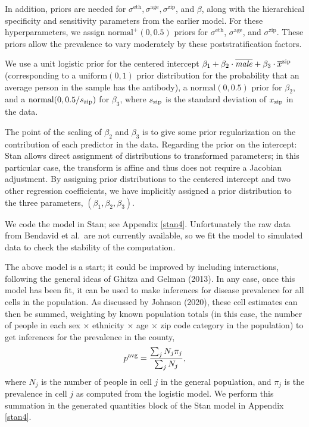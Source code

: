 \documentclass[11pt]{article}
\begin{document}
In addition, priors are needed for
$\sigma^{\textrm{eth}}, \sigma^{\textrm{age}}, \sigma^{\textrm{zip}}$,
and $\beta$, along with the hierarchical specificity and sensitivity
parameters from the earlier model.  
For these hyperparameters, we assign $\mbox{normal}^+(0, 0.5)$ priors for
$\sigma^{\textrm{eth}}$, $\sigma^{\textrm{age}}$, and
$\sigma^{\textrm{zip}}$.  These priors allow the prevalence to vary
moderately by these poststratification factors.

We use a unit logistic prior for the centered
intercept
$\beta_1 + \beta_2 \cdot \overline{\it male} + \beta_3 \cdot \overline{x}^{\rm zip}$
(corresponding to a $\mbox{uniform}(0,1)$ prior distribution for the probability that an average person in the
sample has the antibody), a $\mbox{normal}(0,0.5)$ prior for
$\beta_2$, and a $\mbox{normal}(0, 0.5/s_{\rm zip})$ for $\beta_3$, where $s_{\rm zip}$ is the standard deviation of $x_{\rm zip}$ in the data.

The point of the scaling of $\beta_2$ and $\beta_3$ is to give some prior regularization on the contribution of each predictor in the data.  Regarding the prior on the intercept:
Stan allows direct assignment of distributions to
  transformed parameters; in this particular case, the transform is
  affine and thus does not require a Jacobian adjustment.  By assigning prior distributions to the centered intercept and two other regression coefficients, we have implicitly assigned a prior distribution to the three parameters, $(\beta_1,\beta_2,\beta_3)$.

We code the model in Stan; see Appendix \ref{stan4}.  
 Unfortunately
the raw data from Bendavid et al.\ are not currently available, so we
fit the model to simulated data to check the stability of the
computation.

The above model is a start; it could be improved by including
interactions, following the general ideas of Ghitza and Gelman (2013).
In any case, once this model has been fit, it can be used to make
inferences for disease prevalence for all cells in the population. As
discussed by Johnson (2020), these cell estimates can then be summed,
weighting by known population totals (in this case, the number of
people in each sex $\times$ ethnicity $\times$ age $\times$ zip code
category in the population) to get inferences for the prevalence in
the county,
%
\begin{equation*}
  p^{\textrm{avg}}
  = \frac{\small\textstyle \sum_j N_j\pi_j}
         {\small\textstyle \sum_j N_j},
\end{equation*}
%
where $N_j$ is the
number of people in cell $j$ in the general population, and $\pi_j$ is
the prevalence in cell $j$ as computed from the logistic model.  We
perform this summation in the generated quantities block of the Stan
model in Appendix \ref{stan4}.
\end{document}
